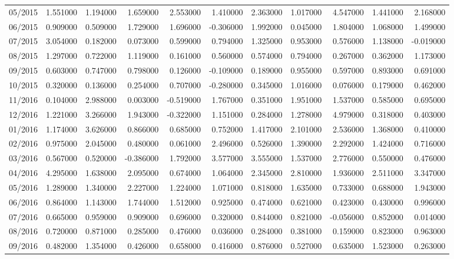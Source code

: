 \begin{tabular}{lrrrrrrrrrr}
05/2015 & 1.551000 & 1.194000 & 1.659000 & 2.553000 & 1.410000 & 2.363000 & 1.017000 & 4.547000 & 1.441000 & 2.168000 \\
06/2015 & 0.909000 & 0.509000 & 1.729000 & 1.696000 & -0.306000 & 1.992000 & 0.045000 & 1.804000 & 1.068000 & 1.499000 \\
07/2015 & 3.054000 & 0.182000 & 0.073000 & 0.599000 & 0.794000 & 1.325000 & 0.953000 & 0.576000 & 1.138000 & -0.019000 \\
08/2015 & 1.297000 & 0.722000 & 1.119000 & 0.161000 & 0.560000 & 0.574000 & 0.794000 & 0.267000 & 0.362000 & 1.173000 \\
09/2015 & 0.603000 & 0.747000 & 0.798000 & 0.126000 & -0.109000 & 0.189000 & 0.955000 & 0.597000 & 0.893000 & 0.691000 \\
10/2015 & 0.320000 & 0.136000 & 0.254000 & 0.707000 & -0.280000 & 0.345000 & 1.016000 & 0.076000 & 0.179000 & 0.462000 \\
11/2016 & 0.104000 & 2.988000 & 0.003000 & -0.519000 & 1.767000 & 0.351000 & 1.951000 & 1.537000 & 0.585000 & 0.695000 \\
12/2016 & 1.221000 & 3.266000 & 1.943000 & -0.322000 & 1.151000 & 0.284000 & 1.278000 & 4.979000 & 0.318000 & 0.403000 \\
01/2016 & 1.174000 & 3.626000 & 0.866000 & 0.685000 & 0.752000 & 1.417000 & 2.101000 & 2.536000 & 1.368000 & 0.410000 \\
02/2016 & 0.975000 & 2.045000 & 0.480000 & 0.061000 & 2.496000 & 0.526000 & 1.390000 & 2.292000 & 1.424000 & 0.716000 \\
03/2016 & 0.567000 & 0.520000 & -0.386000 & 1.792000 & 3.577000 & 3.555000 & 1.537000 & 2.776000 & 0.550000 & 0.476000 \\
04/2016 & 4.295000 & 1.638000 & 2.095000 & 0.674000 & 1.064000 & 2.345000 & 2.810000 & 1.936000 & 2.511000 & 3.347000 \\
05/2016 & 1.289000 & 1.340000 & 2.227000 & 1.224000 & 1.071000 & 0.818000 & 1.635000 & 0.733000 & 0.688000 & 1.943000 \\
06/2016 & 0.864000 & 1.143000 & 1.744000 & 1.512000 & 0.925000 & 0.474000 & 0.621000 & 0.423000 & 0.430000 & 0.996000 \\
07/2016 & 0.665000 & 0.959000 & 0.909000 & 0.696000 & 0.320000 & 0.844000 & 0.821000 & -0.056000 & 0.852000 & 0.014000 \\
08/2016 & 0.720000 & 0.871000 & 0.285000 & 0.476000 & 0.036000 & 0.284000 & 0.381000 & 0.159000 & 0.823000 & 0.963000 \\
09/2016 & 0.482000 & 1.354000 & 0.426000 & 0.658000 & 0.416000 & 0.876000 & 0.527000 & 0.635000 & 1.523000 & 0.263000 \\

\end{tabular}
